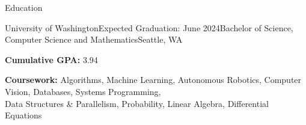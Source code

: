 \documentclass{resume} %
\begin{document}
\vspace{-0.6em} %


\begin{rSection}{Education}

\begin{education}{University of Washington}{Expected Graduation: June 2024}{Bachelor of Science, Computer Science and Mathematics}{Seattle, WA}
\item \textbf{Cumulative GPA:} 3.94
\item \textbf{Coursework:} Algorithms, Machine Learning, Autonomous Robotics, Computer Vision, Databases, Systems Programming, \\ Data Structures \& Parallelism, Probability, Linear Algebra, Differential Equations
\end{education}

\end{rSection}

\end{document}

